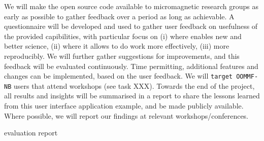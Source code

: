 \begin{workpackage}
\begin{tasklist}
\begin{task}[title=OOMMF case study: Evaluation and refinement]
  We will make the \OOMMFNB{} open source code available to
  micromagnetic research groups as early as possible to gather
  feedback over a period as long as achievable. A questionnaire will
  be developed and used to gather user feedback on usefulness of the
  provided capibilities, with particular focus on (i) where
  \OOMMFNB{} enables new and better science, (ii) where it
  allows to do work more effectively, (iii) more reproducibly. We will
  further gather suggestions for improvements, and this feedback will
  be evaluated continuously. Time permitting, additional features and
  changes can be implemented, based on the user feedback. We will
  \texttt{target OOMMF-NB} users that attend workshops (see task
  XXX). Towards the end of the project, all results and insights will
  be summarised in a report to share the lessons learned from this user
  interface application example, and be made publicly available. Where
  possible, we will report our findings at relevant
  workshops/conferences.
\end{task}
\end{tasklist}

\begin{wpdelivs}
  \begin{wpdeliv}[due=48,id=oommf-nb-evaluation,dissem=??,nature=??]
      {\OOMMFNB{} evaluation report}
\end{wpdeliv}
\end{wpdelivs}
\end{workpackage}

